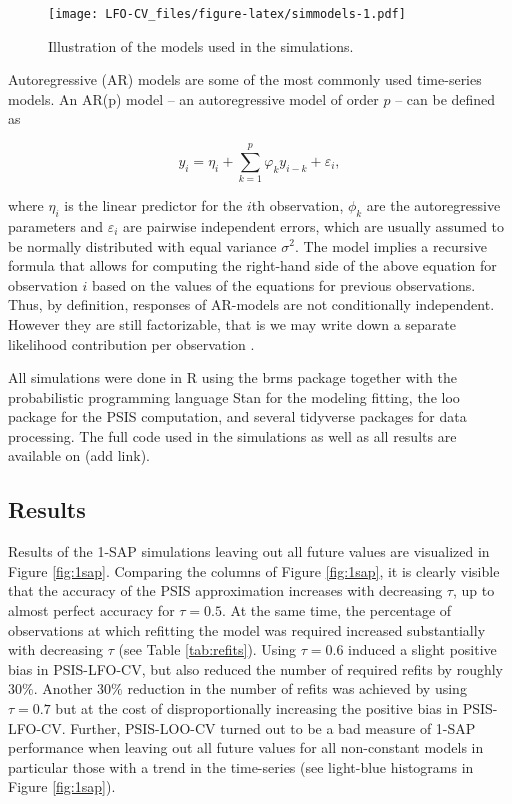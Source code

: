 \documentclass[american,]{article}
\begin{document}
\begin{figure}
\centering
\texttt{[image: LFO-CV\_files/figure-latex/simmodels-1.pdf]}
\caption{\label{fig:simmodels}Illustration of the models used in the simulations.}
\end{figure}

Autoregressive (AR) models are some of the most commonly used time-series models.
An AR(p) model -- an autoregressive model of order \(p\) -- can be defined as

\begin{equation}
y_i = \eta_i + \sum_{k = 1}^p \varphi_k y_{i - k} + \varepsilon_i,
\end{equation}

where \(\eta_i\) is the linear predictor for the \(i\)th observation, \(\phi_k\) are
the autoregressive parameters and \(\varepsilon_i\) are pairwise independent
errors, which are usually assumed to be normally distributed with equal variance
\(\sigma^2\). The model implies a recursive formula that allows for computing the
right-hand side of the above equation for observation \(i\) based on the values of
the equations for previous observations. Thus, by definition, responses of
AR-models are not conditionally independent. However they are still
factorizable, that is we may write down a separate likelihood contribution per
observation \citep[see][ for more discussion on
factorizability of statistical models]{buerkner:non-factorizable}.

All simulations were done in R \citep{R2018} using the brms package \citep{brms1, brms2} together with the probabilistic programming language Stan
\citep{carpenter2017} for the modeling fitting, the loo package \citep{vehtari2017loo} for
the PSIS computation, and several tidyverse packages \citep{tidyverse} for data
processing. The full code used in the simulations as well as all results are
available on (add link).

\hypertarget{sim_results}{%
\subsection{Results}\label{sim_results}}

Results of the 1-SAP simulations leaving out all future values are visualized
in Figure \ref{fig:1sap}. Comparing the columns of Figure \ref{fig:1sap}, it
is clearly visible that the accuracy of the PSIS approximation increases with
decreasing \(\tau\), up to almost perfect accuracy for \(\tau = 0.5\). At the same
time, the percentage of observations at which refitting the model was required
increased substantially with decreasing \(\tau\) (see Table
\ref{tab:refits}). Using \(\tau = 0.6\) induced a slight positive
bias in PSIS-LFO-CV, but also reduced the number of required refits by roughly
\(30\%\). Another \(30\%\) reduction in the number of refits was achieved by
using \(\tau = 0.7\) but at the cost of disproportionally increasing the
positive bias in PSIS-LFO-CV. Further, PSIS-LOO-CV turned out to be a bad
measure of 1-SAP performance when leaving out all future values for all
non-constant models in particular those with a trend in the time-series (see
light-blue histograms in Figure \ref{fig:1sap}).
\end{document}
